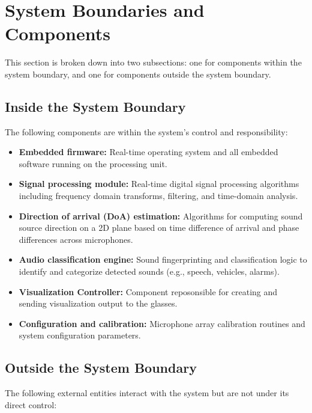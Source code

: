 \documentclass{article}
\begin{document}
\section{System Boundaries and Components}

This section is broken down into two subsections: one for components within the
system boundary, and one for components outside the system boundary.

\subsection{Inside the System Boundary}

The following components are within the system's control and responsibility:

\begin{itemize}
\item \textbf{Embedded firmware:} Real-time operating system and all
embedded software running on the processing unit.

\item \textbf{Signal processing module:} Real-time digital signal processing
algorithms including frequency domain transforms, filtering, and time-domain
analysis.

\item \textbf{Direction of arrival (DoA) estimation:} Algorithms for
computing sound source direction on a 2D plane based on time difference of
arrival and phase differences across microphones.

\item \textbf{Audio classification engine:} Sound fingerprinting and
classification logic to identify and categorize detected sounds (e.g.,
speech, vehicles, alarms).

\item \textbf{Visualization Controller:} \label{comp:viz_controller}
Component reposonsible for creating and sending visualization output to the
glasses.

\item \textbf{Configuration and calibration:} Microphone array calibration
routines and system configuration parameters.
\end{itemize}

\subsection{Outside the System Boundary}

The following external entities interact with the system but are not under
its direct control:
\end{document}
